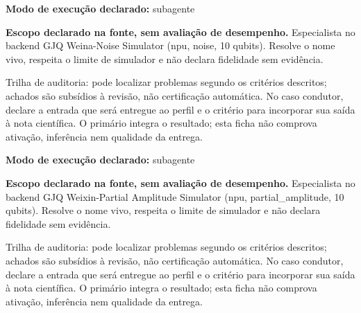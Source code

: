 \begin{arquitetura}
\textbf{Modo de execução declarado:} subagente
\end{arquitetura}


\begin{descricao}
\textbf{Escopo declarado na fonte, sem avaliação de desempenho.}
Especialista no backend GJQ Weina-Noise Simulator (npu, noise, 10 qubits). Resolve o nome vivo, respeita o limite de simulador e não declara fidelidade sem evidência.
\end{descricao}

\begin{funcao}
Trilha de auditoria: pode localizar problemas segundo os critérios descritos; achados são subsídios à revisão, não certificação automática. No caso condutor, declare a entrada que será entregue ao perfil e o critério para incorporar sua saída à nota científica. O primário integra o resultado; esta ficha não comprova ativação, inferência nem qualidade da entrega.
\end{funcao}

\begin{arquitetura}
\textbf{Modo de execução declarado:} subagente
\end{arquitetura}


\begin{descricao}
\textbf{Escopo declarado na fonte, sem avaliação de desempenho.}
Especialista no backend GJQ Weixin-Partial Amplitude Simulator (npu, partial\_amplitude, 10 qubits). Resolve o nome vivo, respeita o limite de simulador e não declara fidelidade sem evidência.
\end{descricao}

\begin{funcao}
Trilha de auditoria: pode localizar problemas segundo os critérios descritos; achados são subsídios à revisão, não certificação automática. No caso condutor, declare a entrada que será entregue ao perfil e o critério para incorporar sua saída à nota científica. O primário integra o resultado; esta ficha não comprova ativação, inferência nem qualidade da entrega.
\end{funcao}


